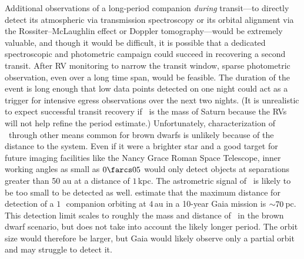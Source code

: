 \documentclass[twocolumn]{aastex63}
\begin{document}
Additional observations of a long-period companion \textit{during} transit---to directly detect its atmospheric via transmission spectroscopy or its orbital alignment via the Rossiter--McLaughlin effect or Doppler tomography---would be extremely valuable, and though it would be difficult, it is possible that a dedicated spectroscopic and photometric campaign could succeed in recovering a second transit. After RV monitoring to narrow the transit window, sparse photometric observation, even over a long time span, would be feasible. The duration of the event is long enough that low data points detected on one night could act as a trigger for intensive egress observations over the next two nights. (It is unrealistic to expect successful transit recovery if \thisstarb\ is the mass of Saturn because the RVs will not help refine the period estimate.) Unfortunately, characterization of \thisstarb\ through other means common for brown dwarfs is unlikely because of the distance to the system. Even if it were a brighter star and a good target for future imaging facilities like the Nancy Grace Roman Space Telescope, inner working angles as small as $0\farcs05$ would only detect objects at separations greater than 50 au at a distance of $1$\,kpc. The astrometric signal of \thisstar\ is likely to be too small to be detected as well. \citet{ranalli:2018} estimate that the maximum distance for detection of a $1$\,\mjup\ companion orbiting at $4$\,au in a 10-year Gaia mission is $\mathord{\sim} 70$\,pc. This detection limit scales to roughly the mass and distance of \thisstarb\ in the brown dwarf scenario, but does not take into account the likely longer period. The orbit size would therefore be larger, but Gaia would likely observe only a partial orbit and may struggle to detect it. 
\end{document}
